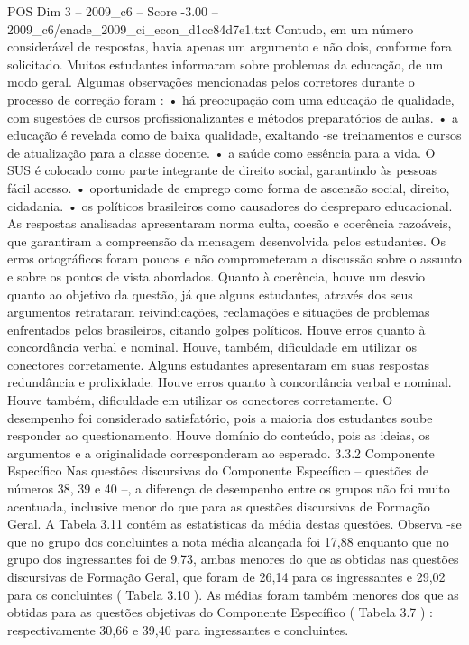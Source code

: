 \begin{textsample}{POS Dim 3 – 2009\_c6 – Score -3.00 – 2009\_c6/enade\_2009\_ci\_econ\_d1cc84d7e1.txt}
Contudo, em um número considerável de respostas, havia apenas um argumento e não dois, conforme fora solicitado.
Muitos estudantes informaram sobre problemas da educação, de um modo geral.
Algumas observações mencionadas pelos corretores durante o processo de correção foram : • há preocupação com uma educação de qualidade, com sugestões de cursos profissionalizantes e métodos preparatórios de aulas. • a educação é revelada como de baixa qualidade, exaltando -se treinamentos e cursos de atualização para a classe docente. • a saúde como essência para a vida.
O SUS é colocado como parte integrante de direito social, garantindo às pessoas fácil acesso. • oportunidade de emprego como forma de ascensão social, direito, cidadania. • os políticos brasileiros como causadores do despreparo educacional.
As respostas analisadas apresentaram norma culta, coesão e coerência razoáveis, que garantiram a compreensão da mensagem desenvolvida pelos estudantes.
Os erros ortográficos foram poucos e não comprometeram a discussão sobre o assunto e sobre os pontos de vista abordados.
Quanto à coerência, houve um desvio quanto ao objetivo da questão, já que alguns estudantes, através dos seus argumentos retrataram reivindicações, reclamações e situações de problemas enfrentados pelos brasileiros, citando golpes políticos.
Houve erros quanto à concordância verbal e nominal.
Houve, também, dificuldade em utilizar os conectores corretamente.
Alguns estudantes apresentaram em suas respostas redundância e prolixidade.
Houve erros quanto à concordância verbal e nominal.
Houve também, dificuldade em utilizar os conectores corretamente.
O desempenho foi considerado satisfatório, pois a maioria dos estudantes soube responder ao questionamento.
Houve domínio do conteúdo, pois as ideias, os argumentos e a originalidade corresponderam ao esperado. 3.3.2 Componente Específico Nas questões discursivas do Componente Específico – questões de números 38, 39 e 40 –, a diferença de desempenho entre os grupos não foi muito acentuada, inclusive menor do que para as questões discursivas de Formação Geral.
A Tabela 3.11 contém as estatísticas da média destas questões.
Observa -se que no grupo dos concluintes a nota média alcançada foi 17,88 enquanto que no grupo dos ingressantes foi de 9,73, ambas menores do que as obtidas nas questões discursivas de Formação Geral, que foram de 26,14 para os ingressantes e 29,02 para os concluintes ( Tabela 3.10 ).
As médias foram também menores dos que as obtidas para as questões objetivas do Componente Específico ( Tabela 3.7 ) : respectivamente 30,66 e 39,40 para ingressantes e concluintes.

\end{textsample}
